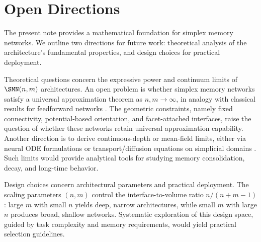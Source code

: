 \section{Open Directions}
\label{sec:open}

The present note provides a mathematical foundation for simplex memory networks. We outline two directions for future work: theoretical analysis of the architecture's fundamental properties, and design choices for practical deployment.

Theoretical questions concern the expressive power and continuum limits of $\SMN(n,m)$ architectures. An open problem is whether simplex memory networks satisfy a universal approximation theorem as $n,m \to \infty$, in analogy with classical results for feedforward networks \cite{Cybenko1989,HornikStinchcombeWhite1989}. The geometric constraints, namely fixed connectivity, potential-based orientation, and facet-attached interfaces, raise the question of whether these networks retain universal approximation capability. Another direction is to derive continuous-depth or mean-field limits, either via neural ODE formulations \cite{ChenRubanovaBettencourtDuvenaud2018} or transport/diffusion equations on simplicial domains \cite{EinizadeThanouMalliarosGiraldo2025}. Such limits would provide analytical tools for studying memory consolidation, decay, and long-time behavior.

Design choices concern architectural parameters and practical deployment. The scaling parameters $(n,m)$ control the interface-to-volume ratio $n/(n+m-1)$: large $m$ with small $n$ yields deep, narrow architectures, while small $m$ with large $n$ produces broad, shallow networks. Systematic exploration of this design space, guided by task complexity and memory requirements, would yield practical selection guidelines.
